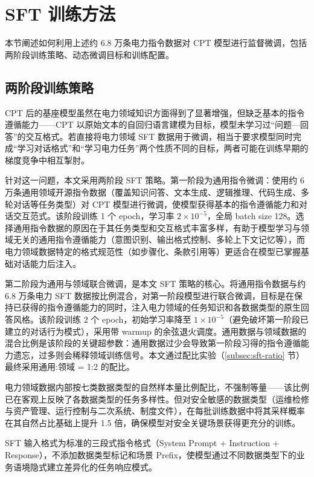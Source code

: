 \documentclass[fontset=fandol,type=master,campus=shenzhen,etitleauto=true]{hithesisbook}
\begin{document}
\section{SFT 训练方法}\label{sec:sft-train}

本节阐述如何利用上述约 6.8 万条电力指令数据对 CPT 模型进行监督微调，包括两阶段训练策略、动态微调目标和训练配置。

\subsection{两阶段训练策略}\label{ux4e24ux9636ux6bb5-sft-ux7b56ux7565}

CPT 后的基座模型虽然在电力领域知识方面得到了显著增强，但缺乏基本的指令遵循能力------CPT 以原始文本的自回归语言建模为目标，模型未学习过``问题---回答''的交互格式。若直接将电力领域 SFT 数据用于微调，相当于要求模型同时完成``学习对话格式''和``学习电力任务''两个性质不同的目标，两者可能在训练早期的梯度竞争中相互掣肘。

针对这一问题，本文采用两阶段 SFT 策略。第一阶段为通用指令微调：使用约 6 万条通用领域开源指令数据（覆盖知识问答、文本生成、逻辑推理、代码生成、多轮对话等任务类型）对 CPT 模型进行微调，使模型获得基本的指令遵循能力和对话交互范式。该阶段训练 1 个 epoch，学习率 $2 \times 10^{-5}$，全局 batch size 128。选择通用指令数据的原因在于其任务类型和交互格式丰富多样，有助于模型学习与领域无关的通用指令遵循能力（意图识别、输出格式控制、多轮上下文记忆等），而电力领域数据特定的格式规范性（如步骤化、条款引用等）更适合在模型已掌握基础对话能力后注入。

第二阶段为通用与领域联合微调，是本文 SFT 策略的核心。将通用指令数据与约 6.8 万条电力 SFT 数据按比例混合，对第一阶段模型进行联合微调，目标是在保持已获得的指令遵循能力的同时，注入电力领域的任务知识和各数据类型的原生回答风格。该阶段训练 2 个 epoch，初始学习率降至 $1 \times 10^{-5}$（避免破坏第一阶段已建立的对话行为模式），采用带 warmup 的余弦退火调度。通用数据与领域数据的混合比例是该阶段的关键超参数：通用数据过少会导致第一阶段习得的指令遵循能力遗忘，过多则会稀释领域训练信号。本文通过配比实验（\ref{subsec:sft-ratio} 节）最终采用通用:领域 = 1:2 的配比。

电力领域数据内部按七类数据类型的自然样本量比例配比，不强制等量------该比例已在客观上反映了各数据类型的任务多样性。但对安全敏感的数据类型（运维检修与资产管理、运行控制与二次系统、制度文件），在每批训练数据中将其采样概率在其自然占比基础上提升 1.5 倍，确保模型对安全关键场景获得更充分的训练。

SFT 输入格式为标准的三段式指令格式（System Prompt + Instruction + Response），不添加数据类型标记和场景 Prefix，使模型通过不同数据类型下的业务语境隐式建立差异化的任务响应模式。
\end{document}
